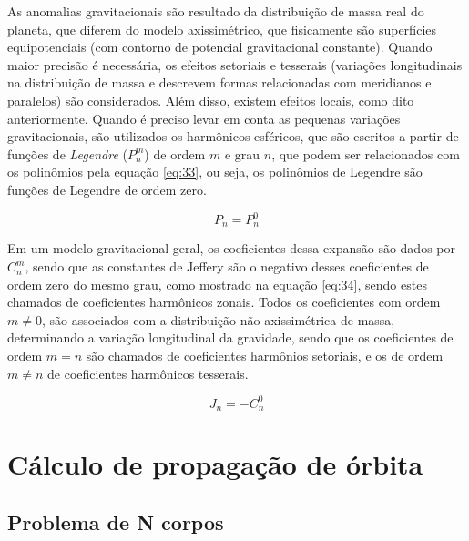 As anomalias gravitacionais são resultado da distribuição de massa real do planeta, que diferem do modelo axissimétrico, que fisicamente são superfícies equipotenciais (com contorno de potencial gravitacional constante). Quando maior precisão é necessária, os efeitos setoriais e tesserais (variações longitudinais na distribuição de massa e descrevem formas relacionadas com meridianos e paralelos) são considerados. Além disso, existem efeitos locais, como dito anteriormente. Quando é preciso levar em conta as pequenas variações gravitacionais, são utilizados os harmônicos esféricos, que são escritos a partir de funções de \textit{Legendre} ($P_{n}^{m}$) de ordem $m$ e grau $n$, que podem ser relacionados com os polinômios pela equação \ref{eq:33}, ou seja, os polinômios de Legendre são funções de Legendre de ordem zero. 


\begin{equation}
  P_{n} = P_{n}^{0}  
  \label{eq:33}
\end{equation}

Em um modelo gravitacional geral, os coeficientes dessa expansão são dados por $C_{n}^{m}$, sendo que as constantes de Jeffery são o negativo desses coeficientes de ordem zero do mesmo grau, como mostrado na equação \ref{eq:34}, sendo estes chamados de coeficientes harmônicos zonais. Todos os coeficientes com ordem $m \neq 0$, são associados com a distribuição não axissimétrica de massa, determinando a variação longitudinal da gravidade, sendo que os coeficientes de ordem $m = n$ são chamados de coeficientes harmônios setoriais, e os de ordem $m \neq n$ de coeficientes harmônicos tesserais. 

\begin{equation}
    J_{n} = -C_{n}^{0}
\label{eq:34}
\end{equation}




\section{Cálculo de propagação de órbita}
\subsection{Problema de N corpos}


